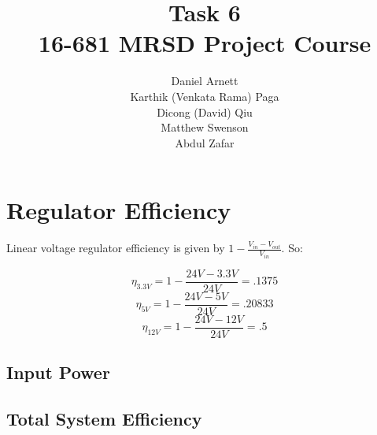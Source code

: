 \documentclass[11pt]{article}
\title{Task 6\\ \vspace{2mm}\Large{16-681 MRSD Project Course }}
\author{
	Daniel Arnett \\
    Karthik (Venkata Rama) Paga\\
	Dicong (David) Qiu\\
	Matthew Swenson\\
	Abdul Zafar
}
\begin{document}
	\maketitle
    \newpage

\section{Regulator Efficiency}
Linear voltage regulator efficiency is given by $1-\frac{V_{in}-V_{out}}{V_{in}}$. 
So: 

$$\eta_{3.3V} = 1-\frac{24V-3.3V}{24V} = .1375$$
$$\eta_{5V} = 1-\frac{24V-5V}{24V} = .20833$$
$$\eta_{12V} = 1-\frac{24V-12V}{24V} = .5$$
\subsection{Input Power}

\subsection{Total System Efficiency}
\end{document}
